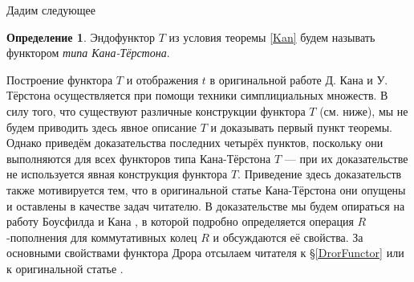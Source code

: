 \documentclass[14pt, dvipsnames, twoside]{extarticle}
\theoremstyle{definition}
\newtheorem{defi}{Определение}
\theoremstyle{remark}
\begin{document}
Дадим следующее

\begin{defi}
Эндофунктор $T$ из условия теоремы \ref{Kan} будем называть функтором {\it типа Кана-Тёрстона}.
\end{defi}


Построение функтора $T$ и отображения $t$ в оригинальной работе Д. Кана и У. Тёрстона осуществляется при помощи техники симплициальных множеств. В силу того, что существуют различные конструкции функтора $T$ (см. ниже), мы не будем приводить здесь явное описание $T$ и доказывать первый пункт теоремы. Однако приведём доказательства последних четырёх пунктов, поскольку они выполняются для всех функторов типа Кана-Тёрстона $T$ --- при их доказательстве не используется явная конструкция функтора $T$. Приведение здесь доказательств также мотивируется тем, что в оригинальной статье Кана-Тёрстона они опущены и оставлены в качестве задач читателю. В доказательстве мы будем опираться на работу Боусфилда и Кана \cite{BousfieldKan}, в которой подробно определяется операция $R$-пополнения для коммутативных колец $R$ и обсуждаются её свойства. За основными свойствами функтора Дрора отсылаем читателя к \S\ref{DrorFunctor} или к оригинальной статье \cite{Dror}.
\end{document}
